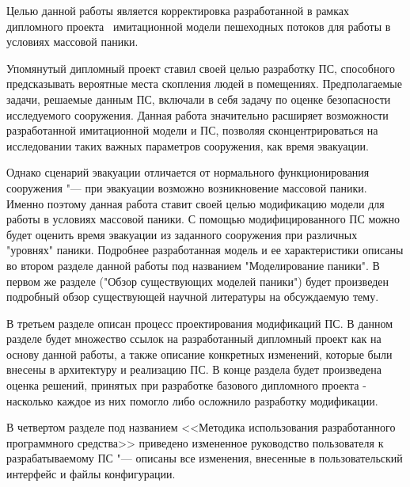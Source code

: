 
\label{sec:intro}

Целью данной работы является корректировка разработанной в рамках дипломного проекта~\cite{my_diploma} имитационной модели пешеходных потоков для работы в условиях массовой паники.

Упомянутый дипломный проект ставил своей целью разработку ПС, способного предсказывать вероятные места скопления людей в помещениях.
Предполагаемые задачи, решаемые данным ПС, включали в себя задачу по оценке безопасности исследуемого сооружения.
Данная работа значительно расширяет возможности разработанной имитационной модели и ПС, позволяя сконцентрироваться на исследовании таких важных параметров сооружения, как время эвакуации.

Однако сценарий эвакуации отличается от нормального функционирования сооружения "--- при эвакуации возможно возникновение массовой паники.
Именно поэтому данная работа ставит своей целью модификацию модели для работы в условиях массовой паники.
С помощью модифицированного ПС можно будет оценить время эвакуации из заданного сооружения при различных "уровнях" паники.
Подробнее разработанная модель и ее характеристики описаны во втором разделе данной работы под названием "Моделирование паники".
В первом же разделе ("Обзор существующих моделей паники") будет произведен подробный обзор существующей научной литературы на обсуждаемую тему.

В третьем разделе описан процесс проектирования модификаций ПС.
В данном разделе будет множество ссылок на разработанный дипломный проект как на основу данной работы, а также описание конкретных изменений, которые были внесены в архитектуру и реализацию ПС.
В конце раздела будет произведена оценка решений, принятых при разработке базового дипломного проекта - насколько каждое из них помогло либо осложнило разработку модификации.

В четвертом разделе под названием <<Методика использования разработанного программного средства>> приведено измененное руководство пользователя к разрабатываемому ПС "--- описаны все изменения, внесенные в пользовательский интерфейс и файлы конфигурации.
